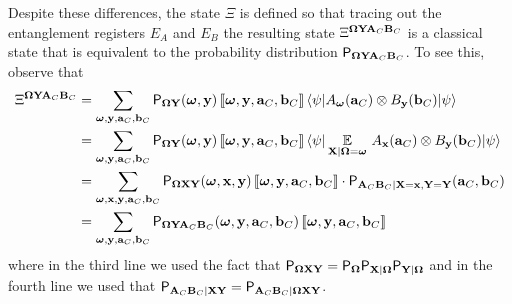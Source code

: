 Despite these differences, the state $\Xi$ is defined so that tracing out the entanglement registers $E_A$ and $E_B$ the resulting state $\Xi^{\bOmega \bY \bA_C \bB_C}$ is a classical state that is equivalent to the probability distribution $\P_{\bOmega \bY \bA_C \bB_C}$. To see this, observe that
\begin{align*}
\Xi^{\bOmega \bY \bA_C \bB_C} &= \sum_{\bomega, \by, \ba_C, \bb_C} \P_{\bOmega \bY}(\bomega, \by) \, \puretomixed{\bomega, \by, \ba_C, \bb_C} \, \bra{\psi} A_\bomega(\ba_C) \otimes B_\by(\bb_C) \ket{\psi} \\
&= \sum_{\bomega, \by, \ba_C, \bb_C} \P_{\bOmega \bY}(\bomega, \by) \, \puretomixed{\bomega, \by, \ba_C, \bb_C} \, \bra{\psi} \Ex_{\bX | \bOmega = \bomega} \, A_\bx(\ba_C)  \otimes B_\by(\bb_C) \ket{\psi} \\
&= \sum_{\bomega, \bx, \by, \ba_C, \bb_C} \P_{\bOmega \bX \bY}(\bomega, \bx, \by) \, \puretomixed{\bomega, \by, \ba_C, \bb_C} \cdot \P_{\bA_C \bB_C | \bX = \bx, \bY = \bY}(\ba_C,\bb_C) \\
&= \sum_{\bomega,\by, \ba_C, \bb_C} \P_{\bOmega\bY \bA_C \bB_C}(\bomega, \by, \ba_C,\bb_C) \, \puretomixed{\bomega, \by, \ba_C, \bb_C}
\end{align*}
where in the third line we used the fact that $\P_{\bOmega \bX \bY} = \P_{\bOmega} \P_{\bX | \bOmega} \P_{\bY | \bOmega}$ and in the fourth line we used that $\P_{\bA_C \bB_C | \bX \bY} = \P_{\bA_C \bB_C | \bOmega \bX \bY}$. 


